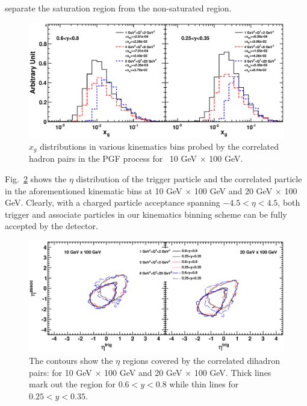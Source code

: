 separate the saturation region from the non-saturated region.
\begin{figure}
\begin{center}
\includegraphics[width=1.0\textwidth]{plots/chpt6/ep_10x100_xg_distribution_multibins.eps} 
\end{center} 
\caption[$x_{g}$ coverage distribution in constrained in different kinematic bins]{$x_{g}$ distributions in various kinematics bins
probed by the correlated hadron pairs in the PGF process for \ep\ 10 GeV
$\times$ 100 GeV. }
\label{fig:xgCover} 
\end{figure}
Fig.~\ref{fig:pairEta} shows the $\eta$ distribution of the trigger
particle and the correlated particle in the aforementioned kinematic
bins at 10 GeV $\times$ 100 GeV and 20 GeV $\times$ 100 GeV. Clearly, with a
charged particle acceptance spanning $-4.5<\eta<4.5$, both trigger and
associate particles in our kinematics binning scheme can be fully accepted by
the detector.
\begin{figure}
\begin{center}
\includegraphics[width=1.0\textwidth]{plots/chpt6/ep_10And20x100_trig_2_asso_1_z_0.2_0.4_multiBin_etaCorre.eps}
\end{center} 
\caption[$\eta$ distribution of the trigger/associate particles in the dihadron pairs]{The contours show the
$\eta$ regions covered by the correlated dihadron pairs: for 10 GeV $\times$ 100
GeV and 20 GeV $\times$ 100 GeV. Thick lines mark out the region for $0.6<y<0.8$
while thin lines for $0.25<y<0.35$.}
\label{fig:pairEta} 
\end{figure}


